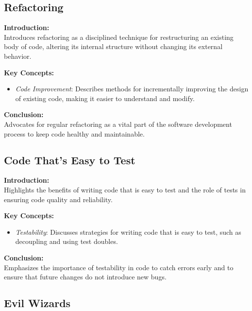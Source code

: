 \subsection{Refactoring}

\textbf{Introduction:} \\
Introduces refactoring as a disciplined technique for restructuring an existing body of code, altering its internal structure without changing its external behavior.

\vspace{2mm}
\noindent\textbf{Key Concepts:}
\begin{itemize}
  \item \textit{Code Improvement}: Describes methods for incrementally improving the design of existing code, making it easier to understand and modify.
\end{itemize}

\vspace{2mm}
\noindent\textbf{Conclusion:} \\
Advocates for regular refactoring as a vital part of the software development process to keep code healthy and maintainable.

\subsection{Code That's Easy to Test}

\textbf{Introduction:} \\
Highlights the benefits of writing code that is easy to test and the role of tests in ensuring code quality and reliability.

\vspace{2mm}
\noindent\textbf{Key Concepts:}
\begin{itemize}
  \item \textit{Testability}: Discusses strategies for writing code that is easy to test, such as decoupling and using test doubles.
\end{itemize}

\vspace{2mm}
\noindent\textbf{Conclusion:} \\
Emphasizes the importance of testability in code to catch errors early and to ensure that future changes do not introduce new bugs.

\subsection{Evil Wizards}


